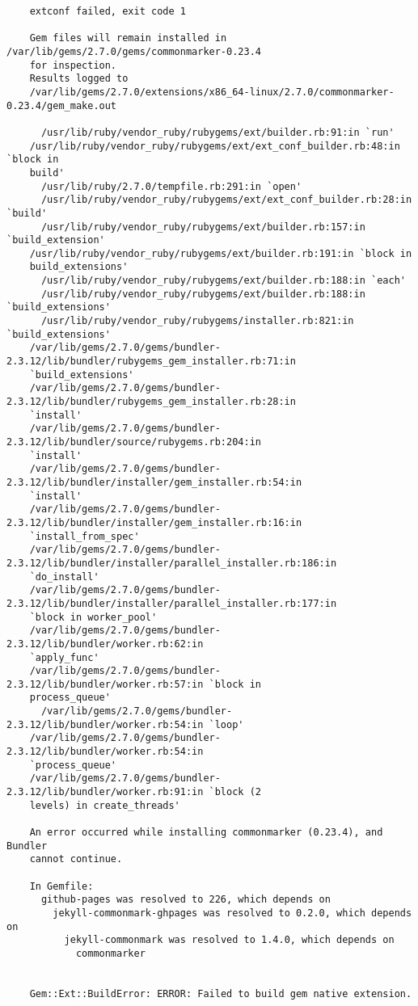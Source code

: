 \documentclass{article}
\numberwithin{equation}{section}
\begin{document}
\begin{verbatim}
	extconf failed, exit code 1
	
	Gem files will remain installed in /var/lib/gems/2.7.0/gems/commonmarker-0.23.4
	for inspection.
	Results logged to
	/var/lib/gems/2.7.0/extensions/x86_64-linux/2.7.0/commonmarker-0.23.4/gem_make.out
	
	  /usr/lib/ruby/vendor_ruby/rubygems/ext/builder.rb:91:in `run'
	/usr/lib/ruby/vendor_ruby/rubygems/ext/ext_conf_builder.rb:48:in `block in
	build'
	  /usr/lib/ruby/2.7.0/tempfile.rb:291:in `open'
	  /usr/lib/ruby/vendor_ruby/rubygems/ext/ext_conf_builder.rb:28:in `build'
	  /usr/lib/ruby/vendor_ruby/rubygems/ext/builder.rb:157:in `build_extension'
	/usr/lib/ruby/vendor_ruby/rubygems/ext/builder.rb:191:in `block in
	build_extensions'
	  /usr/lib/ruby/vendor_ruby/rubygems/ext/builder.rb:188:in `each'
	  /usr/lib/ruby/vendor_ruby/rubygems/ext/builder.rb:188:in `build_extensions'
	  /usr/lib/ruby/vendor_ruby/rubygems/installer.rb:821:in `build_extensions'
	/var/lib/gems/2.7.0/gems/bundler-2.3.12/lib/bundler/rubygems_gem_installer.rb:71:in
	`build_extensions'
	/var/lib/gems/2.7.0/gems/bundler-2.3.12/lib/bundler/rubygems_gem_installer.rb:28:in
	`install'
	/var/lib/gems/2.7.0/gems/bundler-2.3.12/lib/bundler/source/rubygems.rb:204:in
	`install'
	/var/lib/gems/2.7.0/gems/bundler-2.3.12/lib/bundler/installer/gem_installer.rb:54:in
	`install'
	/var/lib/gems/2.7.0/gems/bundler-2.3.12/lib/bundler/installer/gem_installer.rb:16:in
	`install_from_spec'
	/var/lib/gems/2.7.0/gems/bundler-2.3.12/lib/bundler/installer/parallel_installer.rb:186:in
	`do_install'
	/var/lib/gems/2.7.0/gems/bundler-2.3.12/lib/bundler/installer/parallel_installer.rb:177:in
	`block in worker_pool'
	/var/lib/gems/2.7.0/gems/bundler-2.3.12/lib/bundler/worker.rb:62:in
	`apply_func'
	/var/lib/gems/2.7.0/gems/bundler-2.3.12/lib/bundler/worker.rb:57:in `block in
	process_queue'
	  /var/lib/gems/2.7.0/gems/bundler-2.3.12/lib/bundler/worker.rb:54:in `loop'
	/var/lib/gems/2.7.0/gems/bundler-2.3.12/lib/bundler/worker.rb:54:in
	`process_queue'
	/var/lib/gems/2.7.0/gems/bundler-2.3.12/lib/bundler/worker.rb:91:in `block (2
	levels) in create_threads'
	
	An error occurred while installing commonmarker (0.23.4), and Bundler
	cannot continue.
	
	In Gemfile:
	  github-pages was resolved to 226, which depends on
	    jekyll-commonmark-ghpages was resolved to 0.2.0, which depends on
	      jekyll-commonmark was resolved to 1.4.0, which depends on
	        commonmarker
	
	
	Gem::Ext::BuildError: ERROR: Failed to build gem native extension.
	

\end{verbatim}
\end{document}
